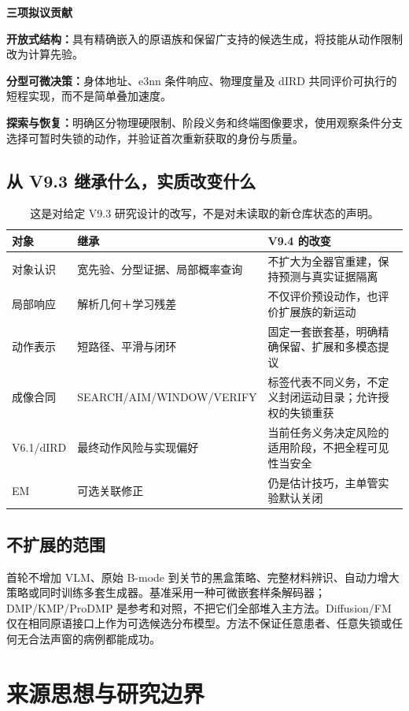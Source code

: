 \documentclass[UTF8,fontset=fandol,11pt,a4paper]{ctexart}
\theoremstyle{plain}
\theoremstyle{definition}
\theoremstyle{remark}
\numberwithin{equation}{section}
\begin{document}
\begin{corebox}
\textbf{三项拟议贡献}\par
\textbf{开放式结构：}具有精确嵌入的原语族和保留广支持的候选生成，将技能从动作限制改为计算先验。\par
\textbf{分型可微决策：}身体地址、e3nn 条件响应、物理度量及 dIRD 共同评价可执行的短程实现，而不是简单叠加速度。\par
\textbf{探索与恢复：}明确区分物理硬限制、阶段义务和终端图像要求，使用观察条件分支选择可暂时失锁的动作，并验证首次重新获取的身份与质量。
\end{corebox}

\subsection{从 V9.3 继承什么，实质改变什么}
\begin{table}[htbp]\centering\small
\begin{tabularx}{\linewidth}{P{29mm}YY}\toprule
对象 & 继承 & V9.4 的改变\\\midrule
对象认识 & 宽先验、分型证据、局部概率查询 & 不扩大为全器官重建，保持预测与真实证据隔离\\
局部响应 & 解析几何＋学习残差 & 不仅评价预设动作，也评价扩展族的新运动\\
动作表示 & 短路径、平滑与闭环 & 固定一套嵌套基，明确精确保留、扩展和多模态提议\\
成像合同 & SEARCH/AIM/WINDOW/VERIFY & 标签代表不同义务，不定义封闭运动目录；允许授权的失锁重获\\
V6.1/dIRD & 最终动作风险与实现偏好 & 当前任务义务决定风险的适用阶段，不把全程可见性当安全\\
EM & 可选关联修正 & 仍是估计技巧，主单管实验默认关闭\\\bottomrule
\end{tabularx}
\caption{这是对给定 V9.3 研究设计的改写，不是对未读取的新仓库状态的声明。}
\end{table}

\subsection{不扩展的范围}
首轮不增加 VLM、原始 B-mode 到关节的黑盒策略、完整材料辨识、自动力增大策略或同时训练多套生成器。基准采用一种可微嵌套样条解码器；DMP/KMP/ProDMP 是参考和对照，不把它们全部堆入主方法。Diffusion/FM 仅在相同原语接口上作为可选候选分布模型。方法不保证任意患者、任意失锁或任何无合法声窗的病例都能成功。

\section{来源思想与研究边界}
\label{sec:related}
\end{document}

